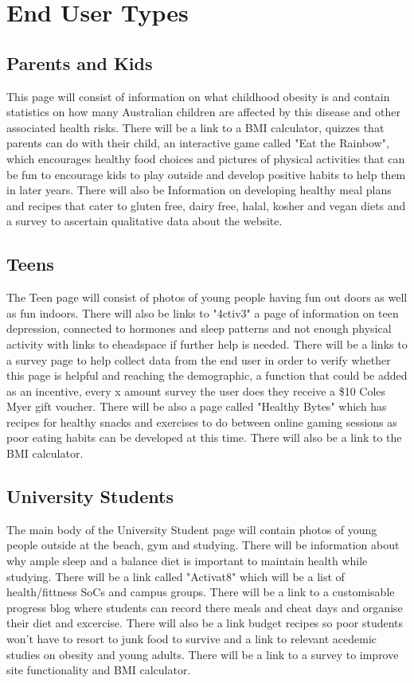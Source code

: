 \documentclass[letterpaper,12pt]{article}
\begin{document}
\section{End User Types}
\subsection{Parents and Kids}

This page will consist of information on what childhood obesity is and contain statistics on how many Australian children are affected by this disease and other associated health risks. There will be a link to a BMI calculator, quizzes that parents can do with their child, an interactive game called "Eat the Rainbow", which encourages healthy food choices and pictures of physical activities that can be fun to encourage kids to play outside and develop positive habits to help them in later years. There will also be Information on developing healthy meal plans and recipes that cater to gluten free, dairy free, halal, kosher and vegan diets and a survey to ascertain qualitative data about the website.

\subsection{Teens}

The Teen page will consist of photos of young people having fun out doors as well as fun indoors. There will also be links to "4ctiv3" a page of information on teen depression, connected to hormones and sleep patterns and not enough physical activity with links to eheadspace if further help is needed. There will be a links to a survey page to help collect data from the end user in order to verify whether this page is helpful and reaching the demographic, a function that could be added as an incentive, every x amount survey the user does they receive a \$10 Coles Myer gift voucher. There will be also a page called "Healthy Bytes" which has recipes for healthy snacks and exercises to do between online gaming sessions as poor eating habits can be developed at this time. There will also be a link to the BMI calculator.

\subsection{University Students}

The main body of the University Student page will contain photos of young people outside at the beach, gym and studying. There will be information about why ample sleep and a balance diet is important to maintain health while studying. There will be a link called "Activat8" which will be a list of health/fittness SoCs and campus groups. There will be a link to a customisable progress blog where students can record there meals and cheat days and organise their diet and excercise. There will also be a link budget recipes so poor students won't have to resort to junk food to survive and a link to relevant acedemic studies on obesity and young adults. There will be a link to a survey to improve site functionality and BMI calculator.
\end{document}
